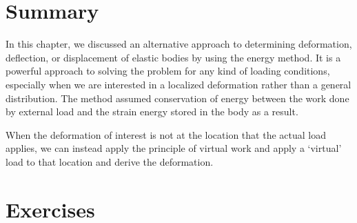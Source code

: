 \documentclass[
10pt,
a4paper,
openany,
svgnames,
]{book} %
\begin{document}
\section*{Summary}

In this chapter, we discussed an alternative approach to determining deformation, deflection, or displacement of elastic bodies by using the energy method. It is a powerful approach to solving the problem for any kind of loading conditions, especially when we are interested in a localized deformation rather than a general distribution. The method assumed conservation of energy between the work done by external load and the strain energy stored in the body as a result.

When the deformation of interest is not at the location that the actual load applies, we can instead apply the principle of virtual work and apply a `virtual' load to that location and derive the deformation.

\section*{Exercises}
\end{document}
